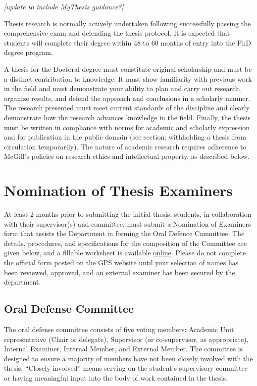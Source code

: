\documentclass[
]{book}
\begin{document}
\emph{{[}update to include MyThesis guidance?{]}}

Thesis research is normally actively undertaken following successfully passing the comprehensive exam and defending the thesis protocol. It is expected that students will complete their degree within 48 to 60 months of entry into the PhD degree program.

A thesis for the Doctoral degree must constitute original scholarship and must be a distinct contribution to knowledge. It must show familiarity with previous work in the field and must demonstrate your ability to plan and carry out research, organize results, and defend the approach and conclusions in a scholarly manner. The research presented must meet current standards of the discipline and clearly demonstrate how the research advances knowledge in the field. Finally, the thesis must be written in compliance with norms for academic and scholarly expression and for publication in the public domain (see section: withholding a thesis from circulation temporarily). The nature of academic research requires adherence to McGill's policies on research ethics and intellectual property, as described below.

\hypertarget{nomination-of-thesis-examiners}{%
\section{Nomination of Thesis Examiners}\label{nomination-of-thesis-examiners}}

At least 2 months prior to submitting the initial thesis, students, in collaboration with their supervisor(s) and committee, must submit a Nomination of Examiners form that assists the Department in forming the Oral Defence Committee. The details, procedures, and specifications for the composition of the Committee are given below, and a fillable worksheet is available \href{https://www.mcgill.ca/epi-biostat-occh/files/epi-biostat-occh/eboh_phd_nom_exam_worksheet_201911.docx}{online}. Please do not complete the official form posted on the GPS website until your selection of names has been reviewed, approved, and an external examiner has been secured by the department.

\hypertarget{oral-defense-committee}{%
\subsection{Oral Defense Committee}\label{oral-defense-committee}}

The oral defense committee consists of five voting members: Academic Unit representative (Chair or delegate), Supervisor (or co-supervisor, as appropriate), Internal Examiner, Internal Member, and External Member. The committee is designed to ensure a majority of members have not been closely involved with the thesis. ``Closely involved'' means serving on the student's supervisory committee or having meaningful input into the body of work contained in the thesis.
\end{document}
